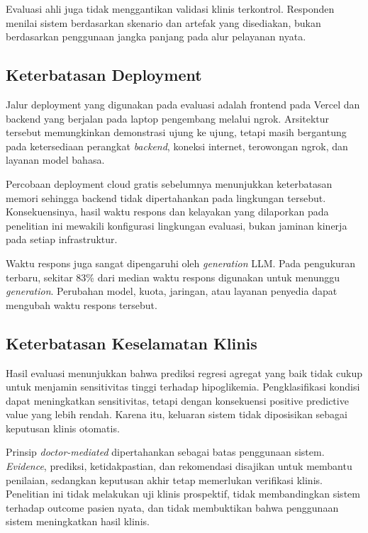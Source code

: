 Evaluasi ahli juga tidak menggantikan validasi klinis terkontrol. Responden menilai sistem berdasarkan skenario dan artefak yang disediakan, bukan berdasarkan
penggunaan jangka panjang pada alur pelayanan nyata.

\subsection{Keterbatasan Deployment}
\label{subsec:bab6-keterbatasan-deployment}

Jalur deployment yang digunakan pada evaluasi adalah frontend pada Vercel dan backend yang berjalan pada laptop pengembang melalui ngrok. Arsitektur tersebut
memungkinkan demonstrasi ujung ke ujung, tetapi masih bergantung pada ketersediaan perangkat \textit{backend}, koneksi internet, terowongan ngrok, dan
layanan model bahasa.

Percobaan deployment cloud gratis sebelumnya menunjukkan keterbatasan memori sehingga backend tidak dipertahankan pada lingkungan tersebut. Konsekuensinya,
hasil waktu respons dan kelayakan yang dilaporkan pada penelitian ini mewakili konfigurasi lingkungan evaluasi, bukan jaminan kinerja pada setiap
infrastruktur.

Waktu respons juga sangat dipengaruhi oleh \textit{generation} LLM. Pada pengukuran terbaru, sekitar 83\% dari median waktu respons digunakan untuk menunggu
\textit{generation}.
Perubahan model, kuota, jaringan, atau layanan penyedia dapat mengubah waktu respons tersebut.

\subsection{Keterbatasan Keselamatan Klinis}
\label{subsec:bab6-keterbatasan-keselamatan}

Hasil evaluasi menunjukkan bahwa prediksi regresi agregat yang baik tidak cukup untuk menjamin sensitivitas tinggi terhadap hipoglikemia. Pengklasifikasi
kondisi dapat meningkatkan sensitivitas, tetapi dengan konsekuensi positive predictive value yang lebih rendah. Karena itu, keluaran sistem tidak
diposisikan sebagai keputusan klinis otomatis.

Prinsip \textit{doctor-mediated} dipertahankan sebagai batas penggunaan sistem. \textit{Evidence}, prediksi, ketidakpastian, dan rekomendasi disajikan untuk
membantu penilaian, sedangkan keputusan akhir tetap memerlukan verifikasi klinis. Penelitian ini tidak melakukan uji klinis prospektif, tidak membandingkan sistem
terhadap outcome pasien nyata, dan tidak membuktikan bahwa penggunaan sistem meningkatkan hasil klinis.


